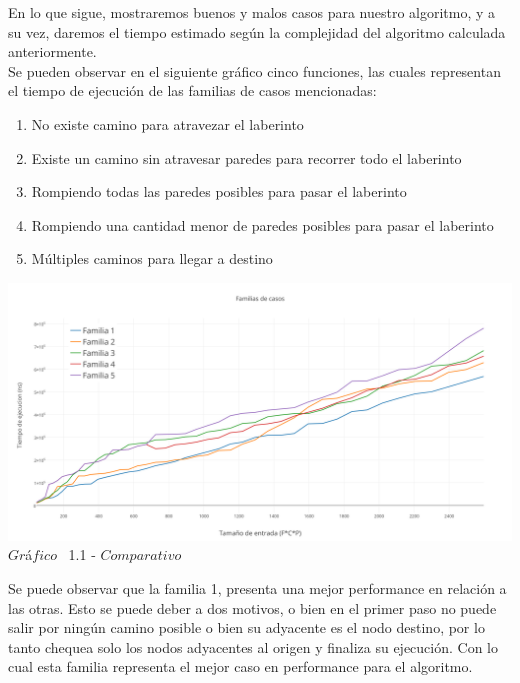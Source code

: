 \indent En lo que sigue, mostraremos buenos y malos casos para nuestro algoritmo, y a su vez, daremos el tiempo estimado 
seg\'un la complejidad del algoritmo calculada anteriormente.\\


Se pueden observar en el siguiente gráfico cinco funciones, las cuales representan el tiempo de ejecuci\'on de las familias de casos mencionadas:\\
\begin{enumerate}
\item No existe camino para atravezar el laberinto
\item Existe un camino sin atravesar paredes para recorrer todo el laberinto
\item Rompiendo todas las paredes posibles para pasar el laberinto
\item Rompiendo una cantidad menor de paredes posibles para pasar el laberinto
\item Múltiples caminos para llegar a destino
\end{enumerate}


\vspace*{0.3cm} \vspace*{0.3cm}
  \begin{center}
 \includegraphics[scale=0.7]{./EJ1/comparativo.png}
 {            $Gr$\'a$fico$ \ 1.1 - $Comparativo$}
  \end{center}
  \vspace*{0.3cm}
  
Se puede observar que la familia 1, presenta una mejor performance en relaci\'on a las otras. Esto se puede deber a dos motivos, o bien en el primer paso no puede salir por ning\'un camino posible o bien su adyacente es el nodo destino, por lo tanto chequea solo los nodos adyacentes al origen y finaliza su ejecuci\'on. Con lo cual esta familia representa el mejor caso en performance para el algoritmo.

